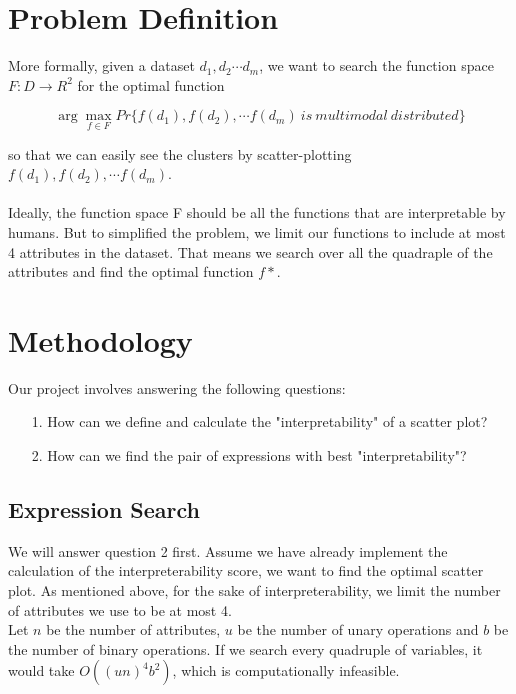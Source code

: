 \documentclass[fleqn]{SelfArx} %
\begin{document}
\section{Problem Definition}
More formally, given a dataset ${d_1 , d_2\cdots d_m }$, we want to search the function space $F: D \rightarrow R^2$
for the optimal function

$$\arg\max_{f \in F} Pr\{f(d_1), f(d_2),\cdots f(d_m)\ is\ multimodal\ distributed\}$$

so that we can easily see the clusters by scatter-plotting $f(d_1), f(d_2),\cdots f(d_m)$.\\
\\

Ideally, the function space F should be all the functions that are interpretable by humans. But to simplified the problem, we limit our functions to include at most 4 attributes in the dataset. That means
we search over all the quadraple of the attributes and find the optimal function $f*$.

\section{Methodology}

Our project involves answering the following questions:
\begin{itemize}
\item[1.] How can we define and calculate the "interpretability" of a scatter plot?
\item[2.] How can we find the pair of expressions with best "interpretability"? 
\end{itemize}

\subsection{Expression Search}

We will answer question 2 first. Assume we have already implement the calculation of the interpreterability score, we want to find the optimal scatter plot. As mentioned above, for the sake of interpreterability, we limit the number of attributes we use to be at most 4.\\

Let $n$ be the number of attributes, $u$ be the number of unary operations and $b$ be the number of binary operations. If we search every quadruple of variables, it would take $O((un)^4b^2)$, which is computationally infeasible.\\
\end{document}
